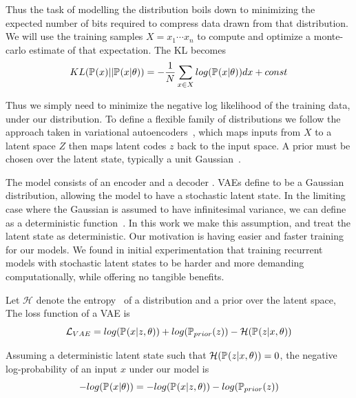 \documentclass[../main.tex]{subfiles}
\begin{document}
Thus the task of modelling the distribution boils down to minimizing the expected number of bits required to compress data drawn from that distribution. We will use the training samples $X={x_1 \cdots x_n}$ to compute and optimize a monte-carlo estimate of that expectation. The KL becomes 
\begin{equation}
    \label{eq:mc_kl}
    KL(\pdf[]{x} || \pdf{x|\theta}) = - \frac{1}{N} \sum_{x \in X} log{(\pdf{x|\theta})} dx + const
\end{equation}{}

Thus we simply need to minimize the negative log likelihood of the training data, under our distribution. To define a flexible family of distributions we follow the approach taken in variational autoencoders~\citep{kingma2013auto}, which maps inputs from $X$ to a latent space $Z$ then maps latent codes $z$ back to the input space. A prior must be chosen over the latent state, typically a unit Gaussian~\citep{kingma2013auto}.

 The model consists of an encoder  and a decoder . VAEs define  to be a Gaussian distribution, allowing the model to have a stochastic latent state. In the limiting case where the Gaussian is assumed to have infinitesimal variance, we can define  as a deterministic function~\cite{kingma2019introduction}. In this work we make this assumption, and treat the latent state as deterministic. Our motivation is having easier and faster training for our models. We found in initial experimentation that training recurrent models with stochastic latent states to be harder and more demanding computationally, while offering no tangible benefits.  

Let $\mathcal{H}$ denote the entropy~\citep{shannon1948mathematical} of a distribution and  a prior over the latent space, The loss function of a VAE\citep{kingma2013auto} is 
\begin{equation}
    \mathcal{L}_{VAE} = log(\pdf{x|z,\theta}) + log(\pdf[prior]{z}) - \mathcal{H}(\pdf{z|x, \theta})
\end{equation}{}

Assuming a deterministic latent state such that $\mathcal{H}(\pdf{z|x, \theta}) = 0$, the negative log-probability of an input $x$ under our model is
\begin{equation}
    \label{eq:logprob}
    -log(\pdf{x|\theta}) = -log(\pdf{x|z,\theta}) - log(\pdf[prior]{z})
\end{equation}{}
\end{document}
